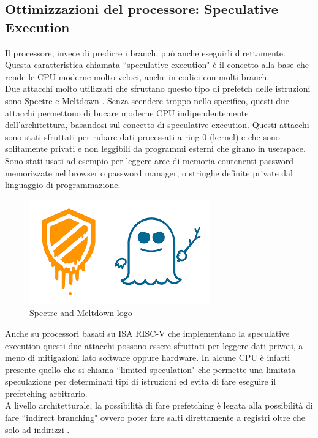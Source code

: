 \subsection*{Ottimizzazioni del processore: Speculative Execution}
Il processore, invece di predirre i branch, può anche eseguirli direttamente. Questa caratteristica chiamata ``speculative execution" è il concetto alla base che rende le CPU moderne molto veloci, anche in codici con molti branch.\\
Due attacchi molto utilizzati che sfruttano questo tipo di prefetch delle istruzioni sono Spectre e Meltdown \cite{spectremeltdown}. Senza scendere troppo nello specifico, questi due attacchi permettono di bucare moderne CPU indipendentemente dell'architettura, basandosi sul concetto di speculative execution. Questi attacchi sono stati sfruttati per rubare dati processati a ring 0 (kernel) e che sono solitamente privati e non leggibili da programmi esterni che girano in userspace. Sono stati usati ad esempio per leggere aree di memoria contenenti password memorizzate nel browser o password manager, o stringhe definite private dal linguaggio di programmazione.
\FloatBarrier
\vspace{1cm}
\begin{figure}[!htbp]
    \centering
    \includegraphics[width=0.4\linewidth]{images/spectre-meltdown.png}
    \caption{Spectre and Meltdown logo}
\end{figure}
\vspace{1cm}
\FloatBarrier
Anche su processori basati su ISA RISC-V che implementano la speculative execution questi due attacchi possono essere sfruttati per leggere dati privati, a meno di mitigazioni lato software oppure hardware. In alcune CPU è infatti presente quello che si chiama ``limited speculation" che permette una limitata speculazione per determinati tipi di istruzioni ed evita di fare eseguire il prefetching arbitrario.\\
A livello architetturale, la possibilità di fare prefetching è legata alla possibilità di fare ``indirect branching" ovvero poter fare salti direttamente a registri oltre che solo ad indirizzi \cite{indirectbranches}.
